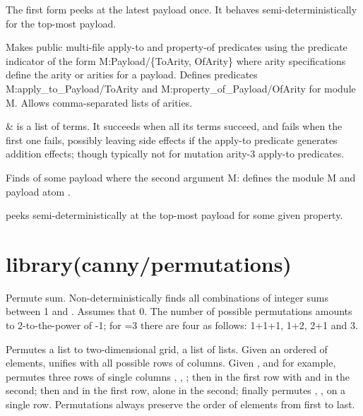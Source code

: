 The first form  peeks at the latest payload once. It behaves
semi-deterministically for the top-most payload.\vspace{0.7cm}

\begin{description}
Makes public multi-file apply-to and property-of predicates using
the predicate indicator  of the form M:Payload/\{ToArity, OfArity\}
where arity specifications define the arity or arities for a
payload. Defines predicates M:apply_to_Payload/ToArity and
M:property_of_Payload/OfArity for module M. Allows comma-separated
lists of arities.

\nodescription

\begin{arguments}
 & is a list of  terms. It succeeds when all its
 terms succeed, and fails when the first one fails, possibly
leaving side effects if the apply-to predicate generates addition
effects; though typically not for mutation arity-3 apply-to
predicates. \\
\end{arguments}

Finds  of some payload where the second argument M:
defines the module M and payload atom .

  peeks semi-deterministically at the top-most payload
for some given property.
\end{description}

\chapter{library(canny/permutations)}\label{sec:permutations}

\begin{description}
Permute sum. Non-deterministically finds all combinations of integer
sums between 1 and . Assumes that 0\Sel{}. The number of possible
permutations amounts to 2-to-the-power of -1; for =3 there are
four as follows: 1+1+1, 1+2, 2+1 and 3.

Permutes a list to two-dimensional grid, a list of lists. Given an
ordered  of elements, unifies  with all possible rows of
columns. Given ,  and  for example, permutes three rows of
single columns , , ; then  in the first row with  and
 in the second; then  and  in the first row,  alone in
the second; finally permutes , ,  on a single row.
Permutations always preserve the order of elements from first to
last.
\end{description}

